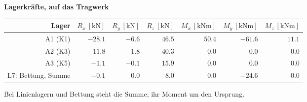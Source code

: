 \documentclass[11pt,a4paper]{article}
\begin{document}
\noindent\textbf{Lagerkräfte, auf das Tragwerk}
\begin{longtable}{rrrrrrr}
\hline
Lager & $R_x\ [\mathrm{kN}]$ & $R_y\ [\mathrm{kN}]$ & $R_z\ [\mathrm{kN}]$ & $M_x\ [\mathrm{kNm}]$ & $M_y\ [\mathrm{kNm}]$ & $M_z\ [\mathrm{kNm}]$ \\
\hline
\endhead
A1 (K1) & $-28.1$ & $-6.6$ & $46.5$ & $50.4$ & $-61.6$ & $11.1$ \\
A2 (K3) & $-11.8$ & $-1.8$ & $40.3$ & $0.0$ & $0.0$ & $0.0$ \\
A3 (K5) & $-1.1$ & $-0.1$ & $15.9$ & $0.0$ & $0.0$ & $0.0$ \\
L7: Bettung, Summe & $-0.1$ & $0.0$ & $8.0$ & $0.0$ & $-24.6$ & $0.0$ \\
\hline
\end{longtable}
Bei Linienlagern und Bettung steht die Summe; ihr Moment um den Ursprung.
\end{document}
